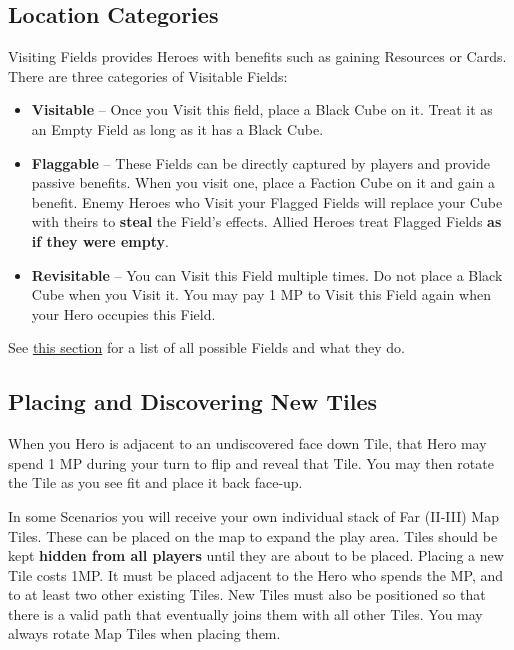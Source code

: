 \begin{multicols}{2}

\subsection*{\hypertarget{Categories}{Location Categories}}
Visiting Fields provides Heroes with benefits such as gaining Resources or Cards.
There are three categories of Visitable Fields:
\begin{itemize}
  \item \textbf{Visitable} – Once you Visit this field, place a Black Cube on it.
    Treat it as an Empty Field as long as it has a Black Cube.
  \item \textbf{Flaggable} – These Fields can be directly captured by players and provide passive benefits.
    When you visit one, place a Faction Cube on it and gain a benefit.
    Enemy Heroes who Visit your Flagged Fields will replace your Cube with theirs to \textbf{steal} the Field’s effects.
    Allied Heroes treat Flagged Fields \textbf{as if they were empty}.
  \item \textbf{Revisitable} – You can Visit this Field multiple times.
    Do not place a Black Cube when you Visit it.
    You may pay 1 MP to Visit this Field again when your Hero occupies this Field.
\end{itemize}

See \hyperlink{All}{this section} for a list of all possible Fields and what they do.
\subsection*{\hypertarget{Placing}{Placing and Discovering New Tiles}}
When you Hero is adjacent to an undiscovered face down Tile, that Hero may spend 1 MP during your turn to flip and reveal that Tile.
You may then rotate the Tile as you see fit and place it back face-up.\par
In some Scenarios you will receive your own individual stack of Far (II-III) Map Tiles.
These can be placed on the map to expand the play area.
Tiles should be kept \textbf{hidden from all players} until they are about to be placed.
Placing a new Tile costs 1MP.
It must be placed adjacent to the Hero who spends the MP, and to at least two other existing Tiles.
New Tiles must also be positioned so that there is a valid path that eventually joins them with all other Tiles.
You may always rotate Map Tiles when placing them.\par

\end{multicols}

